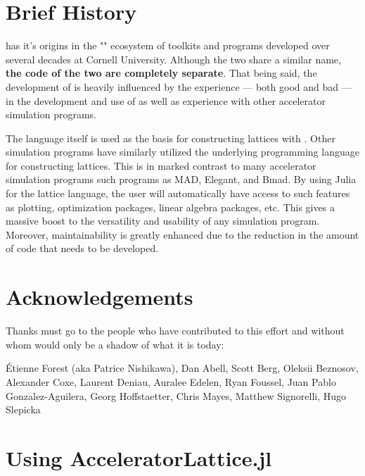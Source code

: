\section{Brief History}

\scibmad has it's origins in the "\Bmad"\cite{Sagan:Bmad2006} ecosystem of toolkits and programs developed over several
decades at Cornell University. Although the two share a similar name, {\bf the code of the two are
completely separate}. That being said, the development of \accellat is heavily influenced by the 
experience --- both good and bad --- in the development and use of  \bmad as well as experience
with other accelerator simulation programs.

The \julia language itself is used as the basis for constructing lattices with \accellat. 
Other simulation programs
have similarly utilized the underlying programming language for constructing 
lattices\cite{Appleby:Merlin2020,Iadarola:Xsuite2023}. This is in marked contrast to many accelerator
simulation programs such programs as MAD\cite{Grote:MAD1989}, Elegant\cite{Borland:Elegant2000}, and
Bmad. 
By using Julia for the lattice language, the user will automatically have access to such features 
as plotting, optimization packages, linear algebra packages, etc. 
This gives a massive boost to the versatility and usability of any \scibmad simulation program.
Moreover, maintainability is greatly enhanced due to the reduction in the amount of code that needs
to be developed.

\section{Acknowledgements}

Thanks must go to the people who have contributed to this effort and without
whom \scibmad would only be a shadow of what it is today: 

\'Etienne Forest (aka Patrice Nishikawa),
Dan Abell,
Scott Berg,
Oleksii Beznosov,
Alexander Coxe,
Laurent Deniau,
Auralee Edelen,
Ryan Foussel,
Juan Pablo Gonzalez-Aguilera,
Georg Hoffstaetter,
Chris Mayes,
Matthew Signorelli,
Hugo Slepicka

\section{Using AcceleratorLattice.jl}

